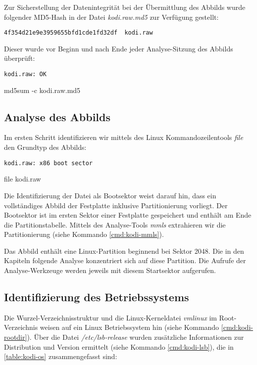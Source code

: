 Zur Sicherstellung der Datenintegrität bei der Übermittlung des Abbilds wurde folgender MD5-Hash in der Datei \textit{kodi.raw.md5} zur Verfügung gestellt:

\begin{verbatim}
4f354d21e9e3959655bfd1cde1fd32df  kodi.raw
\end{verbatim}

Dieser wurde vor Beginn und nach Ende jeder Analyse-Sitzung des Abbilds überprüft:

\begin{cmd}
\begin{verbatim}
kodi.raw: OK
\end{verbatim}
\caption{md5sum -c kodi.raw.md5}
\end{cmd}

\subsection{Analyse des Abbilds}
\label{sec:kodi-rawanalysis}

Im ersten Schritt identifizieren wir mittels des Linux Kommandozeilentools \textit{file} den Grundtyp des Abbilds:

\begin{cmd}
\begin{verbatim}
kodi.raw: x86 boot sector
\end{verbatim}
\caption{file kodi.raw}
\end{cmd}

Die Identifizierung der Datei als Bootsektor weist darauf hin, dass ein vollständiges Abbild der Festplatte inklusive Partitionierung vorliegt. Der Bootsektor ist im ersten Sektor einer Festplatte gespeichert und enthält am Ende die Partitionstabelle. Mittels des Analyse-Tools \textit{mmls} extrahieren wir die Partitionierung (siehe Kommando \autoref{cmd:kodi-mmls}).

Das Abbild enthält eine Linux-Partition beginnend bei Sektor 2048. Die in den Kapiteln folgende Analyse konzentriert sich auf diese Partition. Die Aufrufe der Analyse-Werkzeuge werden jeweils mit diesem Startsektor aufgerufen.

\subsection{Identifizierung des Betriebssystems}
\label{sec:kodi-os}

Die Wurzel-Verzeichnisstruktur und die Linux-Kerneldatei \textit{vmlinux} im Root-Verzeichnis weisen auf ein Linux Betriebssystem hin (siehe Kommando \autoref{cmd:kodi-rootdir}). Über die Datei \textit{/etc/lsb-release} wurden zusätzliche Informationen zur Distribution und Version ermittelt (siehe Kommando \autoref{cmd:kodi-lsb}), die in \autoref{table:kodi-os} zusammengefasst sind:

